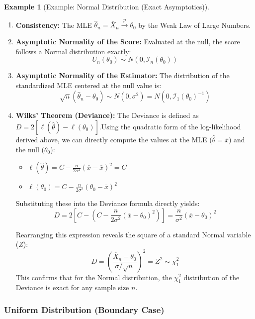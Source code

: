 \documentclass[
  letterpaper,
  DIV=11,
  numbers=noendperiod]{scrreprt}
\providecommand{\tightlist}{%
  \setlength{\itemsep}{0pt}\setlength{\parskip}{0pt}}
\renewcommand{\[}{\begin{equation}}
\renewcommand{\]}{\end{equation}}
\theoremstyle{definition}
\theoremstyle{plain}
\theoremstyle{plain}
\theoremstyle{plain}
\theoremstyle{definition}
\newtheorem{example}{Example}[chapter]
\theoremstyle{plain}
\theoremstyle{remark}
\begin{document}
\begin{example}[Example: Normal Distribution (Exact
Asymptotics)]
\begin{enumerate}
  \begin{enumerate}
  \def\labelenumii{\arabic{enumii}.}
  \item
    \textbf{Consistency:} The MLE
    \(\hat{\theta}_n = \overline{X}_n \xrightarrow{p} \theta_0\) by the
    Weak Law of Large Numbers.
  \item
    \textbf{Asymptotic Normality of the Score:} Evaluated at the null,
    the score follows a Normal distribution exactly: \[
     U_n(\theta_0) \sim N(0, \mathcal{I}_n(\theta_0))
     \]
  \item
    \textbf{Asymptotic Normality of the Estimator:} The distribution of
    the standardized MLE centered at the null value is: \[
     \sqrt{n}(\hat{\theta}_n - \theta_0) \sim N(0, \sigma^2) = N(0, \mathcal{I}_1(\theta_0)^{-1})
     \]
  \item
    \textbf{Wilks' Theorem (Deviance):} The Deviance is defined as
    \(D = 2[\ell(\hat{\theta}) - \ell(\theta_0)]\).Using the quadratic
    form of the log-likelihood derived above, we can directly compute
    the values at the MLE (\(\hat{\theta} = \overline{x}\)) and the null
    (\(\theta_0\)):

    \begin{itemize}
    \tightlist
    \item
      \(\ell(\hat{\theta}) = C - \frac{n}{2\sigma^2}(\overline{x} - \overline{x})^2 = C\)
    \item
      \(\ell(\theta_0) = C - \frac{n}{2\sigma^2}(\theta_0 - \overline{x})^2\)
    \end{itemize}

    Substituting these into the Deviance formula directly yields: \[
     D = 2 \left[ C - \left( C - \frac{n}{2\sigma^2}(\overline{x} - \theta_0)^2 \right) \right] = \frac{n}{\sigma^2}(\overline{x} - \theta_0)^2
     \]

    Rearranging this expression reveals the square of a standard Normal
    variable (\(Z\)): \[
     D = \left( \frac{\overline{X}_n - \theta_0}{\sigma/\sqrt{n}} \right)^2 = Z^2 \sim \chi^2_1
     \] This confirms that for the Normal distribution, the \(\chi^2_1\)
    distribution of the Deviance is exact for any sample size \(n\).
  \end{enumerate}
\end{enumerate}

\end{example}

\subsubsection{Uniform Distribution (Boundary
Case)}\label{uniform-distribution-boundary-case}
\end{document}
